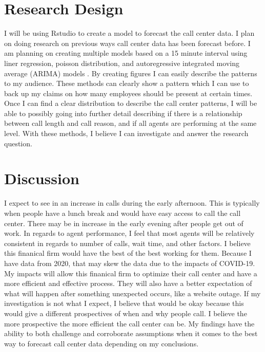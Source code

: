 \documentclass[12pt]{article}
\begin{document}
\section*{Research Design}
I will be using Rstudio to create a model to forecast the call center data. I plan on doing research on previous ways call center data
has been forecast before. I am planning on creating multiple models based on a 15 minute interval using liner regression, poisson distribution,
and autoregressive integrated moving average (ARIMA) models \citep*{ibrahim2016modeling}. By creating figures I can
easily describe the patterns to my audience. These methods can clearly show a pattern which I can use to back up my claims on how many 
employees should be present at certain times. Once I can find a clear distribution to describe the call center patterns, I will be
able to possibly going into further detail describing if there is a relationship between call length and call reason, and if all agents are
performing at the same level. With these methods, I believe I can investigate and answer the research question. 

\section*{Discussion}
I expect to see in an increase in calls during the early afternoon. This is typically when people have a lunch break and would have 
easy access to call the call center. There may be in increase in the early evening after people get out of work. In regards to agent
performance, I feel that most agents will be relatively consistent in regards to number of calls, wait time, and other factors. I believe 
this finanical firm would have the best of the best working for them. Because I have data from 2020, that may skew the data due to the impacts
of COVID-19. My impacts will allow this finanical firm to optimize their call center and have a more efficient and effective process. They will
also have a better expectation of what will happen after something unexpected occurs, like a website outage. If my investigation is not what I 
expect, I believe that would be okay because this would give a different prospectives of when and why people call. I believe the more prospective
the more efficient the call center can be. My findings have the ability to both challenge and corroborate assumptions when it comes to the best way to 
forecast call center data depending on my conclusions.



\end{document}
